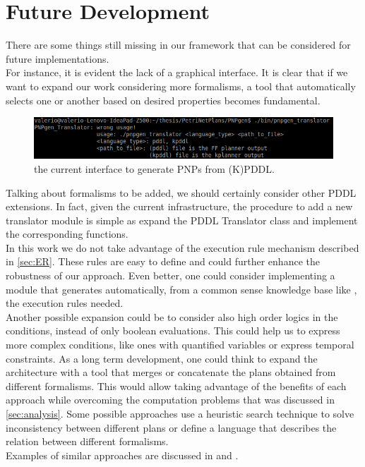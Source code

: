 \documentclass[pdftex,12pt,a4paper]{report}
\begin{document}
\section{Future Development}
There are some things still missing in our framework that can be considered for future implementations.\\
For instance, it is evident the lack of a graphical interface.
It is clear that if we want to expand our work considering more formalisms, a tool that automatically selects one or another based on desired properties becomes fundamental.

\begin{figure}[H]
	\centering
	\includegraphics[scale=0.5]{images/pddltransl.png}
	\caption{the current interface to generate PNPs from (K)PDDL.}
\end{figure}

\noindent Talking about formalisms to be added, we should certainly consider other PDDL extensions. In fact, given the current infrastructure, the procedure to add a new translator module is simple as expand the PDDL Translator class and implement the corresponding functions.\\
In this work we do not take advantage of the execution rule mechanism described in \ref{sec:ER}. These  rules are easy to define and could further enhance the robustness of our approach. Even better, one could consider implementing a module that generates automatically, from a common sense knowledge base like \cite{liu2004conceptnet}, the execution rules needed. \\
Another possible expansion could be to consider also high order logics in the conditions, instead of only boolean evaluations. This could help us to express more complex conditions, like ones with quantified variables or express temporal constraints. 
As a long term development, one could think to expand the architecture with a tool that merges or concatenate the plans obtained from different formalisms. This would allow taking advantage of the benefits of each approach while overcoming the computation problems that was discussed in \ref{sec:analysis}. 
Some possible approaches use a heuristic search technique to solve inconsistency between different plans or define a language that describes the relation between different formalisms.\\
Examples of similar approaches are discussed in \cite{tsamardinos2000merging} and \cite{yang1992merging}.
\end{document}
